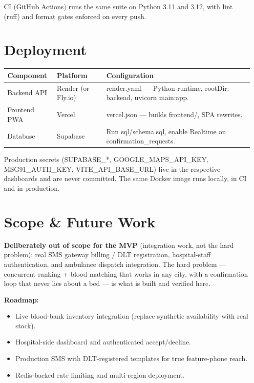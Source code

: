 \documentclass[11pt]{article}
\newcommand{\code}[1]{\colorbox{ghCodeBg}{\ttfamily\small #1}}
\begin{document}
\noindent CI (GitHub Actions) runs the same suite on Python 3.11 and 3.12, with lint
(\code{ruff}) and format gates enforced on every push.

\section{Deployment}

\begin{center}
\begin{tabularx}{\textwidth}{@{}p{3.2cm} p{3.0cm} L@{}}
\toprule
\textbf{Component} & \textbf{Platform} & \textbf{Configuration} \\
\midrule
Backend API & Render (or Fly.io) & \code{render.yaml} --- Python runtime, \code{rootDir: backend}, \code{uvicorn main:app}. \\
Frontend PWA & Vercel & \code{vercel.json} --- builds \code{frontend/}, SPA rewrites. \\
Database & Supabase & Run \code{sql/schema.sql}, enable Realtime on \code{confirmation\_requests}. \\
\bottomrule
\end{tabularx}
\end{center}

\noindent Production secrets (\code{SUPABASE\_*}, \code{GOOGLE\_MAPS\_API\_KEY},
\code{MSG91\_AUTH\_KEY}, \code{VITE\_API\_BASE\_URL}) live in the respective dashboards
and are never committed. The same Docker image runs locally, in CI and in production.

\section{Scope \& Future Work}

\textbf{Deliberately out of scope for the MVP} (integration work, not the hard problem):
real SMS gateway billing / DLT registration, hospital-staff authentication, and
ambulance dispatch integration. The hard problem --- concurrent ranking + blood
matching that works in any city, with a confirmation loop that never lies about a bed
--- is what is built and verified here.

\medskip
\noindent\textbf{Roadmap:}
\begin{itemize}
  \item Live blood-bank inventory integration (replace synthetic availability with real stock).
  \item Hospital-side dashboard and authenticated accept/decline.
  \item Production SMS with DLT-registered templates for true feature-phone reach.
  \item Redis-backed rate limiting and multi-region deployment.
\end{itemize}
\end{document}
